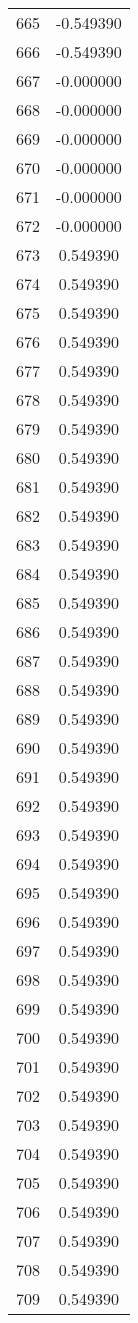 \documentclass[12pt]{article}
\begin{document}
\begin{longtable}{@{}cc@{}}
665 & -0.549390 \\
666 & -0.549390 \\
667 & -0.000000 \\
668 & -0.000000 \\
669 & -0.000000 \\
670 & -0.000000 \\
671 & -0.000000 \\
672 & -0.000000 \\
673 & 0.549390 \\
674 & 0.549390 \\
675 & 0.549390 \\
676 & 0.549390 \\
677 & 0.549390 \\
678 & 0.549390 \\
679 & 0.549390 \\
680 & 0.549390 \\
681 & 0.549390 \\
682 & 0.549390 \\
683 & 0.549390 \\
684 & 0.549390 \\
685 & 0.549390 \\
686 & 0.549390 \\
687 & 0.549390 \\
688 & 0.549390 \\
689 & 0.549390 \\
690 & 0.549390 \\
691 & 0.549390 \\
692 & 0.549390 \\
693 & 0.549390 \\
694 & 0.549390 \\
695 & 0.549390 \\
696 & 0.549390 \\
697 & 0.549390 \\
698 & 0.549390 \\
699 & 0.549390 \\
700 & 0.549390 \\
701 & 0.549390 \\
702 & 0.549390 \\
703 & 0.549390 \\
704 & 0.549390 \\
705 & 0.549390 \\
706 & 0.549390 \\
707 & 0.549390 \\
708 & 0.549390 \\
709 & 0.549390 \\

\end{longtable}
\end{document}
